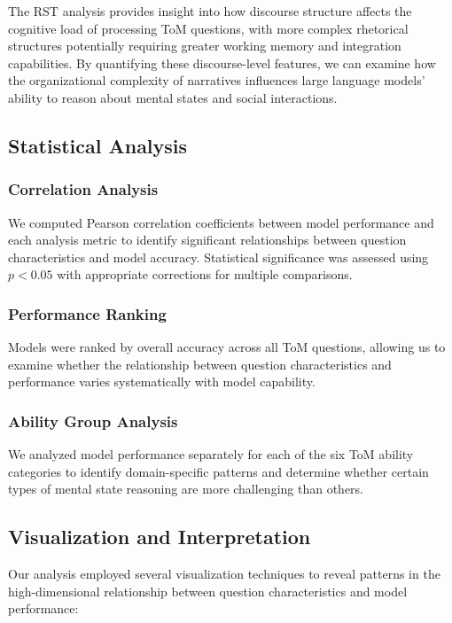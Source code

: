 \documentclass[12pt]{article}
\begin{document}
The RST analysis provides insight into how discourse structure affects the cognitive load of processing ToM questions, with more complex rhetorical structures potentially requiring greater working memory and integration capabilities. By quantifying these discourse-level features, we can examine how the organizational complexity of narratives influences large language models' ability to reason about mental states and social interactions.

\subsection{Statistical Analysis}

\subsubsection{Correlation Analysis}

We computed Pearson correlation coefficients between model performance and each analysis metric to identify significant relationships between question characteristics and model accuracy. Statistical significance was assessed using $p < 0.05$ with appropriate corrections for multiple comparisons.

\subsubsection{Performance Ranking}

Models were ranked by overall accuracy across all ToM questions, allowing us to examine whether the relationship between question characteristics and performance varies systematically with model capability.

\subsubsection{Ability Group Analysis}

We analyzed model performance separately for each of the six ToM ability categories to identify domain-specific patterns and determine whether certain types of mental state reasoning are more challenging than others.

\subsection{Visualization and Interpretation}

Our analysis employed several visualization techniques to reveal patterns in the high-dimensional relationship between question characteristics and model performance:
\end{document}
